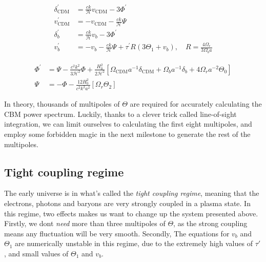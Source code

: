 \documentclass[10pt, a4paper]{article}
\begin{document}
\begin{align}
    \delta_{\mathrm{CDM}}^{\prime} &=\frac{c k}{\mathcal{H}} v_{\mathrm{CDM}}-3 \Phi^{\prime} \\
    v_{\mathrm{CDM}}^{\prime} &=-v_{\mathrm{CDM}}-\frac{c k}{\mathcal{H}} \Psi \\
    \delta_{b}^{\prime} &=\frac{c k}{\mathcal{H}} v_{b}-3 \Phi^{\prime} \\
    v_{b}^{\prime} &=-v_{b}-\frac{c k}{\mathcal{H}} \Psi+\tau^{\prime} R\left(3 \Theta_{1}+v_{b}\right), \quad R = \frac{4\Omega_r}{3\Omega_b a}
\end{align}

\begin{align}
    \label{eqn:ODEstop}
    \Phi^{\prime} &=\Psi-\frac{c^{2} k^{2}}{3 \mathcal{H}^{2}} \Phi+\frac{H_{0}^{2}}{2 \mathcal{H}^{2}}\left[\Omega_{\mathrm{CDM}} a^{-1} \delta_{\mathrm{CDM}}+\Omega_{b} a^{-1} \delta_{b}+4 \Omega_{r} a^{-2} \Theta_{0}\right] \\
    \label{eqn:Psi}
    \Psi &=-\Phi-\frac{12 H_{0}^{2}}{c^{2} k^{2} a^{2}}\left[\Omega_{r} \Theta_{2}\right]
\end{align}

In theory, thousands of multipoles of $\Theta$ are required for accurately calculating the CBM power spectrum. Luckily, thanks to a clever trick called line-of-sight integration, we can limit ourselves to calculating the first eight multipoles, and employ some forbidden magic in the next milestone to generate the rest of the multipoles.


\subsection{Tight coupling regime}
The early universe is in what's called the \textit{tight coupling regime}, meaning that the electrons, photons and baryons are very strongly coupled in a plasma state. In this regime, two effects makes us want to change up the system presented above. Firstly, we dont \textit{need} more than three multipoles of $\Theta$, as the strong coupling means any fluctuation will be very smooth. Secondly, The equations for $v_b$ and $\Theta_1$ are numerically unstable in this regime, due to the extremely high values of $\tau'$, and small values of $\Theta_1$ and $v_b$.
\end{document}
